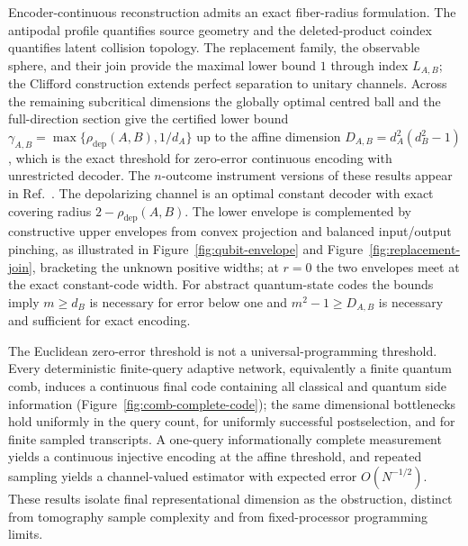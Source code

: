 \documentclass[11pt,a4paper]{article}
\theoremstyle{definition}
\theoremstyle{plain}
\theoremstyle{remark}
\newcommand{\rhodep}{\rho_{\mathrm{dep}}}
\begin{document}
Encoder-continuous reconstruction admits an exact fiber-radius formulation. The antipodal profile quantifies source geometry and the deleted-product coindex quantifies latent collision topology. The replacement family, the observable sphere, and their join provide the maximal lower bound $1$ through index $L_{A,B}$; the Clifford construction extends perfect separation to unitary channels. Across the remaining subcritical dimensions the globally optimal centred ball and the full-direction section give the certified lower bound $\gamma_{A,B}=\max\{\rhodep(A,B),1/d_A\}$ up to the affine dimension $D_{A,B}=d_A^2(d_B^2-1)$, which is the exact threshold for zero-error continuous encoding with unrestricted decoder. The $n$-outcome instrument versions of these results appear in Ref.~\cite{CompanionInstruments}. The depolarizing channel is an optimal constant decoder with exact covering radius $2-\rhodep(A,B)$. The lower envelope is complemented by constructive upper envelopes from convex projection and balanced input/output pinching, as illustrated in Figure~\ref{fig:qubit-envelope} and Figure~\ref{fig:replacement-join}, bracketing the unknown positive widths; at $r=0$ the two envelopes meet at the exact constant-code width. For abstract quantum-state codes the bounds imply $m\ge d_B$ is necessary for error below one and $m^2-1\ge D_{A,B}$ is necessary and sufficient for exact encoding.

The Euclidean zero-error threshold is not a universal-programming threshold. Every deterministic finite-query adaptive network, equivalently a finite quantum comb, induces a continuous final code containing all classical and quantum side information (Figure~\ref{fig:comb-complete-code}); the same dimensional bottlenecks hold uniformly in the query count, for uniformly successful postselection, and for finite sampled transcripts. A one-query informationally complete measurement yields a continuous injective encoding at the affine threshold, and repeated sampling yields a channel-valued estimator with expected error $O(N^{-1/2})$. These results isolate final representational dimension as the obstruction, distinct from tomography sample complexity and from fixed-processor programming limits.
\end{document}
